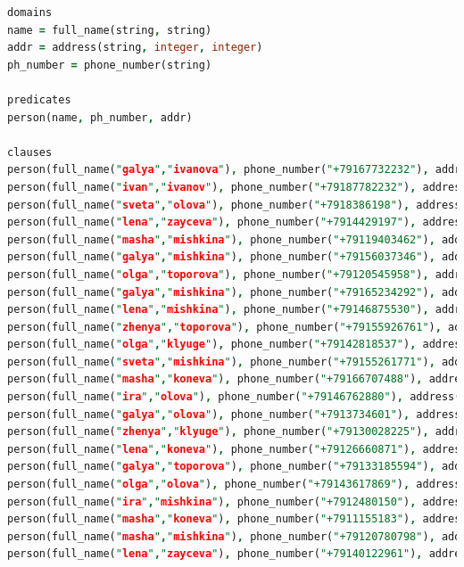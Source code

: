\begin{lstlisting}[language=prolog,label=some-code1,caption=Задание 1]
domains
name = full_name(string, string)
addr = address(string, integer, integer)
ph_number = phone_number(string)

predicates
person(name, ph_number, addr)

clauses
person(full_name("galya","ivanova"), phone_number("+79167732232"), address("pushkina", 7, 228)).
person(full_name("ivan","ivanov"), phone_number("+79187782232"), address("antonova", 7, 228)).
person(full_name("sveta","olova"), phone_number("+7918386198"), address("varshavshkoe sh.", 20, 607)).
person(full_name("lena","zayceva"), phone_number("+7914429197"), address("lermontovskiy pr.", 38, 608)).
person(full_name("masha","mishkina"), phone_number("+79119403462"), address("pushkina", 23, 531)).
person(full_name("galya","mishkina"), phone_number("+79156037346"), address("lermontovskiy pr.", 87, 408)).
person(full_name("olga","toporova"), phone_number("+79120545958"), address("antonova", 37, 1311)).
person(full_name("galya","mishkina"), phone_number("+79165234292"), address("solomonova", 14, 251)).
person(full_name("lena","mishkina"), phone_number("+79146875530"), address("gadjieva", 2, 169)).
person(full_name("zhenya","toporova"), phone_number("+79155926761"), address("solomonova", 92, 1017)).
person(full_name("olga","klyuge"), phone_number("+79142818537"), address("solomonova", 34, 447)).
person(full_name("sveta","mishkina"), phone_number("+79155261771"), address("lermontovskiy pr.", 36, 1220)).
person(full_name("masha","koneva"), phone_number("+79166707488"), address("solomonova", 52, 488)).
person(full_name("ira","olova"), phone_number("+79146762880"), address("solomonova", 1, 905)).
person(full_name("galya","olova"), phone_number("+7913734601"), address("gadjieva", 57, 400)).
person(full_name("zhenya","klyuge"), phone_number("+79130028225"), address("venevskaya", 8, 968)).
person(full_name("lena","koneva"), phone_number("+79126660871"), address("gadjieva", 24, 641)).
person(full_name("galya","toporova"), phone_number("+79133185594"), address("pushkina", 8, 759)).
person(full_name("olga","olova"), phone_number("+79143617869"), address("lermontovskiy pr.", 44, 428)).
person(full_name("ira","mishkina"), phone_number("+7912480150"), address("venevskaya", 5, 453)).
person(full_name("masha","koneva"), phone_number("+7911155183"), address("pushkina", 15, 77)).
person(full_name("masha","mishkina"), phone_number("+79120780798"), address("lermontovskiy pr.", 48, 324)).
person(full_name("lena","zayceva"), phone_number("+79140122961"), address("antonova", 54, 289)).

\end{lstlisting}
